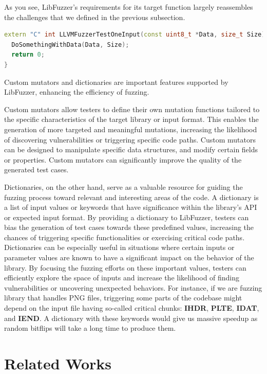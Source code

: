 \documentclass[a4paper,11pt,oneside]{report}
\begin{document}
As you see, LibFuzzer's requirements for its target function
largely reassembles the challenges that we defined in the previous 
subsection.

\begin{lstlisting}[language={c++}]
extern "C" int LLVMFuzzerTestOneInput(const uint8_t *Data, size_t Size) {
  DoSomethingWithData(Data, Size);
  return 0;
}
\end{lstlisting}


Custom mutators and dictionaries are important features 
supported by LibFuzzer, enhancing the efficiency of fuzzing.

Custom mutators allow testers to define their own mutation 
functions tailored to the specific characteristics of the 
target library or input format. This enables the generation 
of more targeted and meaningful mutations, increasing the 
likelihood of discovering vulnerabilities or triggering 
specific code paths. Custom mutators can be designed to 
manipulate specific data structures, and modify certain 
fields or properties. Custom mutators can significantly 
improve the quality of the generated test cases.

Dictionaries, on the other hand, serve as a valuable 
resource for guiding the fuzzing process toward relevant 
and interesting areas of the code. A dictionary is 
a list of input values or keywords that have significance 
within the library's API or expected input format. 
By providing a dictionary to LibFuzzer, testers can 
bias the generation of test cases towards these predefined values, 
increasing the chances of triggering specific functionalities or 
exercising critical code paths. Dictionaries can be especially useful 
in situations where certain inputs or parameter values are 
known to have a significant impact on the behavior of the library. 
By focusing the fuzzing efforts on these important values, 
testers can efficiently explore the space of inputs and 
increase the likelihood of finding vulnerabilities or uncovering unexpected behaviors.
For instance, if we are fuzzing library that handles PNG files, triggering
some parts of the codebase might depend on the input file having so-called critical chunks: \textbf{IHDR},
\textbf{PLTE}, \textbf{IDAT}, and \textbf{IEND}.
A dictionary with these keywords would give us massive speedup as random 
bitflips will take a long time to produce them.


\section{Related Works}
\end{document}
